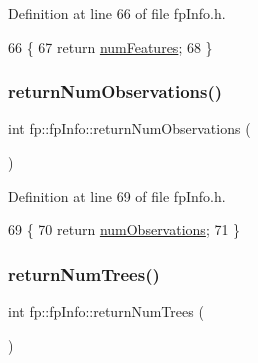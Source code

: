 Definition at line 66 of file fp\+Info.\+h.


\begin{DoxyCode}
66                                           \{
67                 \textcolor{keywordflow}{return} \hyperlink{classfp_1_1fpInfo_a6ed8deabebae772fc213730cd29a2e61}{numFeatures};
68             \}
\end{DoxyCode}
\mbox{\label{classfp_1_1fpInfo_a5d70dfbd1f8dc26dbd8f066e210cf165}} 
\subsubsection{\texorpdfstring{return\+Num\+Observations()}{returnNumObservations()}}
{\footnotesize\ttfamily int fp\+::fp\+Info\+::return\+Num\+Observations (\begin{DoxyParamCaption}{ }\end{DoxyParamCaption})\hspace{0.3cm}{\ttfamily [inline]}}



Definition at line 69 of file fp\+Info.\+h.


\begin{DoxyCode}
69                                               \{
70                 \textcolor{keywordflow}{return} \hyperlink{classfp_1_1fpInfo_a1b35cd17d4ddb35e232246a6549d7a74}{numObservations};
71             \}
\end{DoxyCode}
\mbox{\label{classfp_1_1fpInfo_a12d3d4b2216f37daf6555f07148c4f85}} 
\subsubsection{\texorpdfstring{return\+Num\+Trees()}{returnNumTrees()}}
{\footnotesize\ttfamily int fp\+::fp\+Info\+::return\+Num\+Trees (\begin{DoxyParamCaption}{ }\end{DoxyParamCaption})\hspace{0.3cm}{\ttfamily [inline]}}



